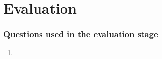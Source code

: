 \section{Evaluation}
\label{sec:evaluation}

\subsubsection*{Questions used in the evaluation stage}
\begin{enumerate}
    \item
\end{enumerate}